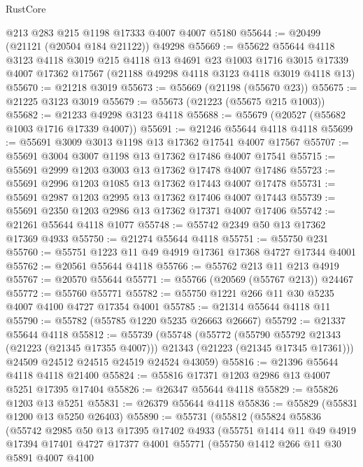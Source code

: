 \begin{lexlean}{RustCore}
\begin{coremodule}
    @213
    @283
    @215
    @1198
    @17333
    @4007
    @4007
    @5180
@55644 := @20499 (@21121 (@20504 @184 @21122)) @49298
@55669 := @55622
    @55644
    @4118
    @3123
    @4118
    @3019
    @215
    @4118
    @13
    @4691
    @23
    @1003
    @1716
    @3015
    @17339
    @4007
    @17362
    @17567
    (@21188 @49298 @4118 @3123 @4118 @3019 @4118 @13)
@55670 := @21218 @3019
@55673 := @55669 (@21198 (@55670 @23))
@55675 := @21225 @3123 @3019
@55679 := @55673 (@21223 (@55675 @215 @1003))
@55682 := @21233 @49298 @3123 @4118
@55688 := @55679 (@20527 (@55682 @1003 @1716 @17339 @4007))
@55691 := @21246 @55644 @4118 @4118
@55699 := @55691 @3009 @3013 @1198 @13 @17362 @17541 @4007 @17567
@55707 := @55691 @3004 @3007 @1198 @13 @17362 @17486 @4007 @17541
@55715 := @55691 @2999 @1203 @3003 @13 @17362 @17478 @4007 @17486
@55723 := @55691 @2996 @1203 @1085 @13 @17362 @17443 @4007 @17478
@55731 := @55691 @2987 @1203 @2995 @13 @17362 @17406 @4007 @17443
@55739 := @55691 @2350 @1203 @2986 @13 @17362 @17371 @4007 @17406
@55742 := @21261 @55644 @4118 @1077
@55748 := @55742 @2349 @50 @13 @17362 @17369 @4933
@55750 := @21274 @55644 @4118
@55751 := @55750 @231
@55760 := @55751 @1223 @11 @49 @4919 @17361 @17368 @4727 @17344 @4001
@55762 := @20561 @55644 @4118
@55766 := @55762 @213 @11 @213 @4919
@55767 := @20570 @55644
@55771 := @55766 (@20569 (@55767 @213)) @24467
@55772 := @55760 @55771
@55782 := @55750 @1221 @266 @11 @30 @5235 @4007 @4100 @4727 @17354 @4001
@55785 := @21314 @55644 @4118 @11
@55790 := @55782 (@55785 @1220 @5235 @26663 @26667)
@55792 := @21337 @55644 @4118
@55812 := @55739
    (@55748
      (@55772
        (@55790 @55792 @21343 (@21223 (@21345 @17355 @4007)))
        @21343
        (@21223 (@21345 @17345 @17361)))
      @24509
      @24512
      @24515
      @24519
      @24524
      @43059)
@55816 := @21396 @55644 @4118 @4118 @21400
@55824 := @55816 @17371 @1203 @2986 @13 @4007 @5251 @17395 @17404
@55826 := @26347 @55644 @4118
@55829 := @55826 @1203 @13 @5251
@55831 := @26379 @55644 @4118
@55836 := @55829 (@55831 @1200 @13 @5250 @26403)
@55890 := @55731
    (@55812
      (@55824
        @55836
        (@55742
          @2985
          @50
          @13
          @17395
          @17402
          @4933
          (@55751
            @1414
            @11
            @49
            @4919
            @17394
            @17401
            @4727
            @17377
            @4001
            @55771
            (@55750
              @1412
              @266
              @11
              @30
              @5891
              @4007
              @4100

\end{coremodule}
\end{lexlean}
